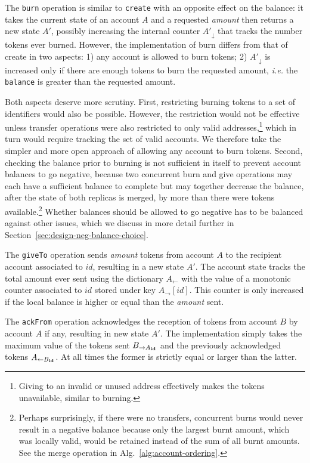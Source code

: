 \documentclass[9pt, oneside]{article}   	%
\begin{document}
The \texttt{burn} operation is similar to \texttt{create} with an opposite effect on the balance: it takes the current state of an account $A$ and a requested \textit{amount} then returns a new state $A'$, possibly increasing the internal counter $A'_\downarrow$ that tracks the number tokens ever burned. However, the implementation of burn differs from that of create in two aspects: 1) any account is allowed to burn tokens; 2) $A'_\downarrow$ is increased only if there are enough tokens to burn the requested amount, \textit{i.e.} the \texttt{balance} is greater than the requested amount. 

Both aspects deserve more scrutiny. First, restricting burning tokens to a set of identifiers would also be possible. However, the restriction would not be effective unless transfer operations were also restricted to only valid addresses,\footnote{Giving to an invalid or unused address effectively makes the tokens unavailable, similar to burning.} which in turn would require tracking the set of valid accounts. We therefore take the simpler and more open approach of allowing any account to burn tokens. Second, checking the balance prior to burning is not sufficient in itself to prevent account balances to go negative, because two concurrent burn and give operations may each have a sufficient balance to complete but may together decrease the balance, after the state of both replicas is merged, by more than there were tokens available.\footnote{Perhaps surprisingly, if there were no transfers, concurrent burns would never result in a negative balance because only the largest burnt amount, which was locally valid, would be retained instead of the sum of all burnt amounts. See the merge operation in Alg.~\ref{alg:account-ordering}.} Whether balances should be allowed to go negative has to be balanced against other issues, which we discuss in more detail further in Section~\ref{sec:design-neg-balance-choice}.

The \texttt{giveTo} operation sends \textit{amount} tokens from account $A$ to the recipient account associated to $id$, resulting in a new state $A'$. The account state tracks the total amount ever sent using the dictionary $A_{\leftarrow}$ with the value of a monotonic counter associated to $id$ stored under key $A_{\rightarrow}[id]$. This counter is only increased if the local balance is higher or equal than the \textit{amount} sent.

The \texttt{ackFrom} operation acknowledges the reception of tokens from account $B$ by account $A$ if any, resulting in new state $A'$. The implementation simply takes the maximum value of the tokens sent $B_{\rightarrow A_{\tiny \textbf{id}}}$ and the previously acknowledged tokens $A_{\leftarrow B_{\tiny \textbf{id}}}$. At all times the former is strictly equal or larger than the latter.
\end{document}
